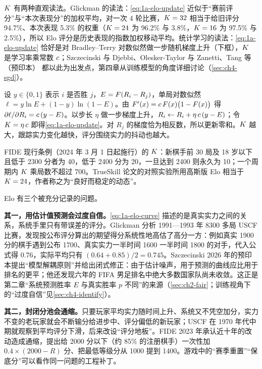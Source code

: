$K$ 有两种直观读法。Glickman 的读法：\cref{eq:1a-elo-update} 近似于“赛前评分”与“本次表现分”的加权平均，对一次 4 轮比赛，$K=32$ 相当于给旧评分 94.7\%、本次表现 5.3\% 的权重（$K=24$ 为 96.2\% 与 3.8\%，$K=16$ 为 97.5\% 与 2.5\%），所以 Elo 评分是历史表现的指数加权移动平均\cite{glickman1995comprehensive}\tagLit。统计学习的读法：\cref{eq:1a-elo-update} 恰好是对 Bradley–Terry 对数似然做一步随机梯度上升（下框），$K$ 是学习率乘常数 $c$；Szczecinski 与 Djebbi\cite{szczecinski2019understanding}、Olesker-Taylor 与 Zanetti\cite{oleskertaylor2024analysis}、Tang 等（预印本）\cite{tang2025elo} 都以此为出发点\tagLit，第四章从训练模型的角度详细讨论（\cref{sec:ch4-sgd}）。

\begin{derivbox}
设 $y\in\{0,1\}$ 表示 $i$ 是否胜 $j$，$E=F(R_i-R_j)$，单局对数似然 $\ell = y\ln E + (1-y)\ln(1-E)$。由 $F'(x)=c\,F(x)\big(1-F(x)\big)$ 得 $\partial \ell/\partial R_i = c\,(y-E)$。以步长 $\eta$ 做一步梯度上升，$R_i \leftarrow R_i + \eta\,c\,(y-E)$；令 $K=\eta\,c$ 即得\cref{eq:1a-elo-update}。对 $R_j$ 的梯度恰为相反数，所以更新零和。$K$ 越大，跟踪实力变化越快，评分围绕实力的抖动也越大。\tagOwn
\end{derivbox}

FIDE 现行条例（2024 年 3 月 1 日起施行）的 $K$：新棋手前 30 局及 18 岁以下且低于 2300 分者为 40，低于 2400 分为 20，一旦达到 2400 则永久为 10；一个周期内 $K$ 乘局数不超过 700\cite{fide2024rating}\tagOff。TrueSkill 论文的对照实验所用高斯版 Elo 相当于 $K=24$，作者称之为“良好而稳定的动态”\cite{herbrich2006trueskill}\tagLit。

Elo 有三个被充分记录的问题。

\textbf{其一，用估计值预测会过度自信。}\cref{eq:1a-elo-curve} 描述的是真实实力之间的关系，系统手里只有带误差的评分。Glickman 分析 1991—1993 年 8300 多局 USCF 比赛，发现按公布评分算出的期望得分系统性地高估了高分一方：例如真实 1900 分的棋手遇到公布 1700、真实实力一半时间 1600 一半时间 1800 的对手，代入公式得 0.76，实际平均只有 $(0.64+0.85)/2=0.745$\cite{glickman1995comprehensive}\tagLit。Szczecinski 2026 年的预印本提出“模型解耦原则”并给出闭式修正：由于估计噪声，用于预测的曲线应比用于排名的更平；他还发现六年的 FIFA 男足排名中绝大多数国家队尚未收敛\cite{szczecinski2026new}\tagLit。这正是第二章“系统预测胜率 $E$ 与真实胜率 $p$ 不同”的来源（\cref{sec:ch2-fair}；训练视角下的“过度自信”见\cref{sec:ch4-identify}）。

\textbf{其二，封闭分池会通缩。}只要玩家平均实力随时间上升、系统又不凭空加分，实力不变的老玩家就会不断输分给进步中、评分偏低的新玩家；USCF 在 1970 年代中期就观察到平均评分下滑，后来改设“评分地板”\cite{glickman1995comprehensive}\tagLit。FIDE 2023 年承认近十年的改动造成通缩，提出给 2000 分以下（约 85\% 的注册棋手）一次性加 $0.4\times(2000-R)$ 分、把最低等级分从 1000 提到 1400\cite{fide2023seeks}\tagOff。游戏中的“赛季重置”“保底分”可以看作同一问题的工程补丁。

